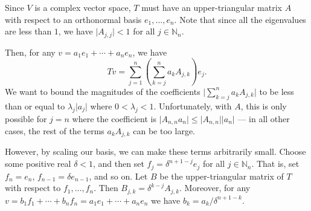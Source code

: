 \documentclass[12pt, letterpaper]{hmcpset}
\begin{document}
\begin{solution}
	Since  $V$ is a complex vector space, $T$ must have an upper-triangular matrix $A$ with respect to an orthonormal basis $e_{1}, \dots, e_{n}$. Note that since all the eigenvalues are less than $1$, we have $\lvert A_{j, j} \rvert < 1$ for all $j \in \mathbb{N}_{n}$. 

	Then, for any $v = a_{1} e_{1} + \cdots + a_{n} e_{n}$, we have
	\[
		Tv = \sum_{j = 1}^{n} \left ( \sum_{k = j}^{n} a_{k} A_{j, k} \right ) e_{j}.
	\]
	We want to bound the magnitudes of the coefficients $\lvert \sum_{k = j}^{n} a_{k} A_{j, k} \rvert$ to be less than or equal to $\lambda_{j} \lvert a_{j} \rvert$ where $0 < \lambda_j < 1$. Unfortunately, with $A$, this is only possible for $j = n$ where the coefficient is $\lvert A_{n, n} a_{n} \rvert \le \lvert A_{n, n} \rvert \lvert a_{n} \rvert$ --- in all other cases, the rest of the terms $a_{k} A_{j, k}$ can be too large.

	However, by scaling our basis, we can make these terms arbitrarily small. Choose some positive real $\delta < 1$, and then set $f_{j} = \delta^{n + 1 - j} e_{j}$ for all $j \in \mathbb{N}_{n}$. That is, set $f_{n} = e_{n}$, $f_{n - 1} = \delta e_{n - 1}$, and so on. Let $B$ be the upper-triangular matrix of $T$ with respect to $f_{1}, \dots, f_{n}$. Then $B_{j, k} = \delta^{k - j} A_{j, k}$. Moreover, for any $v = b_{1} f_{1} + \cdots + b_{n} f_{n} = a_{1} e_{1} + \cdots + a_{n} e_{n}$ we have $b_{k} = a_{k}/\delta^{n + 1 - k}$.


\end{solution}
\end{document}
